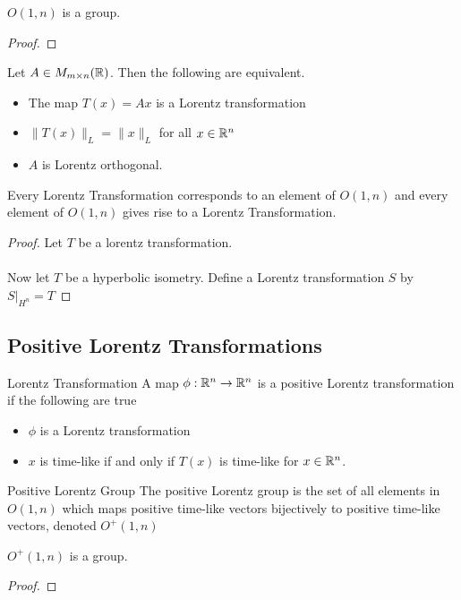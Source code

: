 \documentclass[a4paper]{article}
\begin{document}
\begin{prp}{}{} $O(1,n)$ is a group. \tcbline
\begin{proof}
\end{proof}
\end{prp}

\begin{prp}{}{} Let $A\in M_{m\times n}(\mathbb{R})$. Then the following are equivalent. 
\begin{itemize}
\item The map $T(x)=Ax$ is a Lorentz transformation
\item $\|T(x)\|_L=\|x\|_L$ for all $x\in\mathbb{R}^n$
\item $A$ is Lorentz orthogonal. 
\end{itemize}
\end{prp}

\begin{crl}{}{} Every Lorentz Transformation corresponds to an element of $O(1,n)$ and every element of $O(1,n)$ gives rise to a Lorentz Transformation. \tcbline
\begin{proof}
Let $T$ be a lorentz transformation. \\~\\
Now let $T$ be a hyperbolic isometry. Define a Lorentz transformation $S$ by $S|_{H^n}=T$
\end{proof}
\end{crl}

\subsection{Positive Lorentz Transformations}
\begin{defn}{Lorentz Transformation}{} A map $\phi:\mathbb{R}^n\to\mathbb{R}^n$ is a positive Lorentz transformation if the following are true
\begin{itemize}
\item $\phi$ is a Lorentz transformation
\item $x$ is time-like if and only if $T(x)$ is time-like for $x\in\mathbb{R}^n$. 
\end{itemize}
\end{defn}

\begin{defn}{Positive Lorentz Group}{} The positive Lorentz group is the set of all elements in $O(1,n)$ which maps positive time-like vectors bijectively to positive time-like vectors, denoted $O^+(1,n)$
\end{defn}

\begin{prp}{}{} $O^+(1,n)$ is a group. \tcbline
\begin{proof}
\end{proof}
\end{prp}
\end{document}
